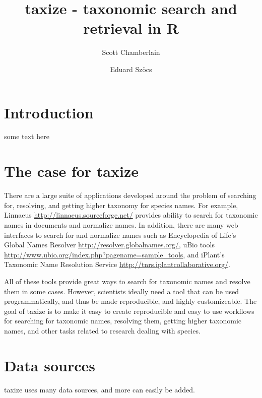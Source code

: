 \documentclass[letterpaper,superscriptaddress,showkeys,longbibliography]{revtex4-1}\usepackage{graphicx, color}
\begin{document}
\title{taxize - taxonomic search and retrieval in R}

\author{Scott Chamberlain}

\author{Eduard Sz\"{o}cs}

\maketitle

\section{Introduction}

some text here

\section{The case for taxize}

There are a large suite of applications developed around the problem of searching for, resolving, and getting higher taxonomy for species names. For example, Linnaeus \url{http://linnaeus.sourceforge.net/} provides ability to search for taxonomic names in documents and normalize names. In addition, there are many web interfaces to search for and normalize names such as Encyclopedia of Life's Global Names Resolver \url{http://resolver.globalnames.org/}, uBio tools \url{http://www.ubio.org/index.php?pagename=sample_tools}, and iPlant's Taxonomic Name Resolution Service \url{http://tnrs.iplantcollaborative.org/}. 

All of these tools provide great ways to search for taxonomic names and resolve them in some cases. However, scientists ideally need a tool that can be used programmatically, and thus be made reproducible, and highly customizeable. The goal of taxize is to make it easy to create reproducible and easy to use workflows for searching for taxonomic names, resolving them, getting higher taxonomic names, and other tasks related to research dealing with species. 

\section{Data sources}

taxize uses many data sources, and more can easily be added. 
\end{document}
